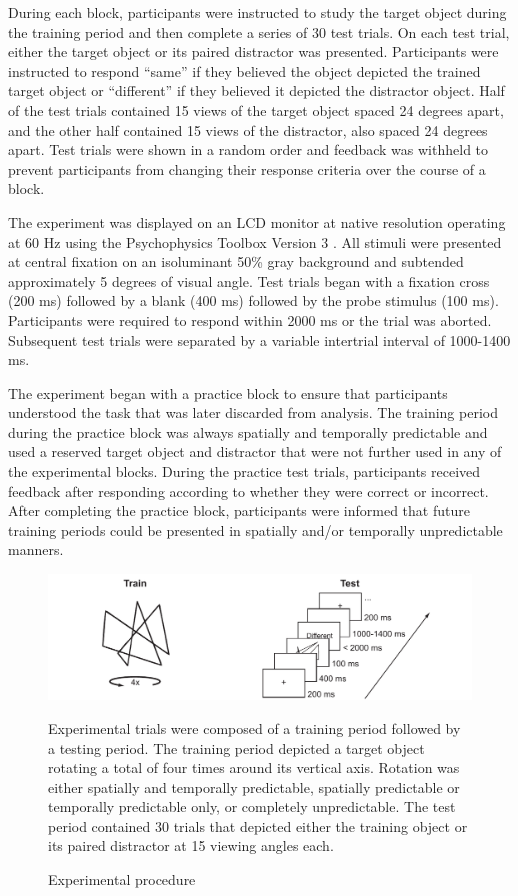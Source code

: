 \documentclass[dwyatte_dissertation.tex]{subfiles}
\begin{document}
During each block, participants were instructed to study the target object during the training period and then complete a series of 30 test trials. On each test trial, either the target object or its paired distractor was presented. Participants were instructed to respond ``same'' if they believed the object depicted the trained target object or ``different'' if they believed it depicted the distractor object. Half of the test trials contained 15 views of the target object spaced 24 degrees apart, and the other half contained 15 views of the distractor, also spaced 24 degrees apart. Test trials were shown in a random order and feedback was withheld to prevent participants from changing their response criteria over the course of a block. 

The experiment was displayed on an LCD monitor at native resolution operating at 60 Hz using the Psychophysics Toolbox Version 3 \cite{Brainard97,Pelli97}. All stimuli were presented at central fixation on an isoluminant 50\% gray background and subtended approximately 5 degrees of visual angle. Test trials began with a fixation cross (200 ms) followed by a blank (400 ms) followed by the probe stimulus (100 ms). Participants were required to respond within 2000 ms or the trial was aborted. Subsequent test trials were separated by a variable intertrial interval of 1000-1400 ms.

The experiment began with a practice block to ensure that participants understood the task that was later discarded from analysis. The training period during the practice block was always spatially and temporally predictable and used a reserved target object and distractor that were not further used in any of the experimental blocks. During the practice test trials, participants received feedback after responding according to whether they were correct or incorrect. After completing the practice block, participants were informed that future training periods could be presented in spatially and/or temporally unpredictable manners.

\begin{figure}[h!]
\includegraphics[width=160mm]{figs/chap_bpleast/paperclip_task.pdf} \\
\caption{Experimental procedure}{Experimental trials were composed of a training period followed by a testing period. The training period depicted a target object rotating a total of four times around its vertical axis. Rotation was either spatially and temporally predictable, spatially predictable or temporally predictable only, or completely unpredictable. The test period contained 30 trials that depicted either the training object or its paired distractor at 15 viewing angles each.}
\label{fig:bpleast_task}
\end{figure}
\end{document}
